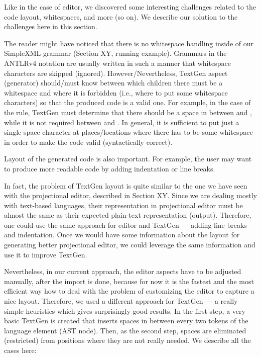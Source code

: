 Like in the case of editor, we discovered some interesting challenges related to the code layout, whitespaces, and more (so on).
We describe our solution to the challenges here in this section.

The reader might have noticed that there is no whitespace handling inside of our SimpleXML grammar (Section XY, running example).
Grammars in the ANTLRv4 notation are usually written in such a manner that whitespace characters are skipped (ignored).
However/Nevertheless, TextGen aspect (generator) should/must know between which children there must be a whitespace and where it is forbidden (i.e., where to put some whitespace characters) so that the produced code is a valid one.
For example, in the case of the  rule, TextGen must determine that there should be a space in between  and , while it is not required between \antlrliteral{\textless} and .
In general, it is sufficient to put just a single space character at places/locations where there has to be some whitespace in order to make the code valid (syntactically correct).

Layout of the generated code is also important. For example, the user may want to produce more readable code by adding indentation or line breaks.

In fact, the problem of TextGen layout is quite similar to the one we have seen with the projectional editor, described in Section XY.
Since we are dealing mostly with text-based languages, their representation in projectional editor must be almost the same as their expected plain-text representation (output).
Therefore, one could use the same approach for editor and TextGen --- adding line breaks and indentation.
Once we would have some information about the layout for generating better projectional editor, we could leverage the same information and use it to improve TextGen.

Nevertheless, in our current approach, the editor aspects have to be adjusted manually, after the import is done, because for now it is the fastest and the most efficient way how to deal with the problem of customizing the editor to capture a nice layout.
Therefore, we used a different approach for TextGen --- a really simple heuristics which gives surprisingly good results.
In the first step, a very basic TextGen is created that inserts spaces in between every two tokens of the language element (AST node).
Then, as the second step, spaces are eliminated (restricted) from positions where they are not really needed.
We describe all the cases here:

